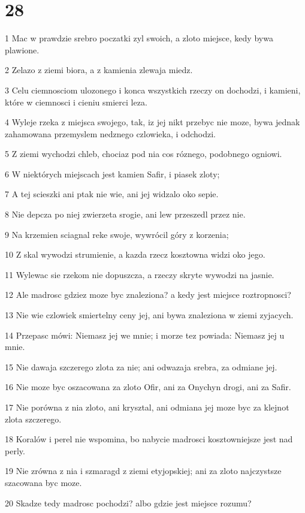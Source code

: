 \chapter{28}

\par 1 Mac w prawdzie srebro poczatki zyl swoich, a zloto miejsce, kedy bywa plawione.
\par 2 Zelazo z ziemi biora, a z kamienia zlewaja miedz.
\par 3 Celu ciemnosciom ulozonego i konca wszystkich rzeczy on dochodzi, i kamieni, które w ciemnosci i cieniu smierci leza.
\par 4 Wyleje rzeka z miejsca swojego, tak, iz jej nikt przebyc nie moze, bywa jednak zahamowana przemyslem nedznego czlowieka, i odchodzi.
\par 5 Z ziemi wychodzi chleb, chociaz pod nia cos róznego, podobnego ogniowi.
\par 6 W niektórych miejscach jest kamien Safir, i piasek zloty;
\par 7 A tej scieszki ani ptak nie wie, ani jej widzalo oko sepie.
\par 8 Nie depcza po niej zwierzeta srogie, ani lew przeszedl przez nie.
\par 9 Na krzemien sciagnal reke swoje, wywrócil góry z korzenia;
\par 10 Z skal wywodzi strumienie, a kazda rzecz kosztowna widzi oko jego.
\par 11 Wylewac sie rzekom nie dopuszcza, a rzeczy skryte wywodzi na jasnie.
\par 12 Ale madrosc gdziez moze byc znaleziona? a kedy jest miejsce roztropnosci?
\par 13 Nie wie czlowiek smiertelny ceny jej, ani bywa znaleziona w ziemi zyjacych.
\par 14 Przepasc mówi: Niemasz jej we mnie; i morze tez powiada: Niemasz jej u mnie.
\par 15 Nie dawaja szczerego zlota za nie; ani odwazaja srebra, za odmiane jej.
\par 16 Nie moze byc oszacowana za zloto Ofir, ani za Onychyn drogi, ani za Safir.
\par 17 Nie porówna z nia zloto, ani krysztal, ani odmiana jej moze byc za klejnot zlota szczerego.
\par 18 Koralów i perel nie wspomina, bo nabycie madrosci kosztowniejsze jest nad perly.
\par 19 Nie zrówna z nia i szmaragd z ziemi etyjopskiej; ani za zloto najczystsze szacowana byc moze.
\par 20 Skadze tedy madrosc pochodzi? albo gdzie jest miejsce rozumu?
